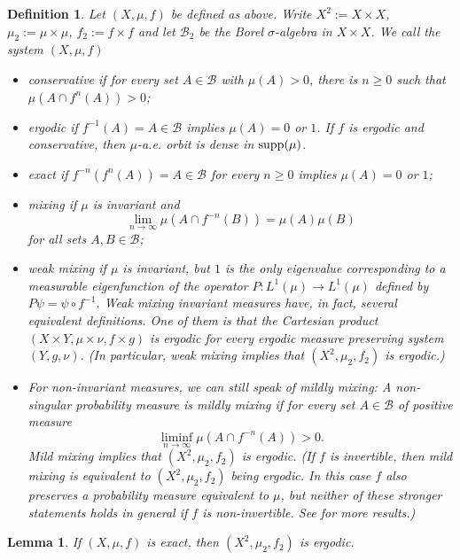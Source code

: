 \documentclass[12pt, psamsfonts, reqno]{amsart}
\newtheorem{definition}[theorem]{Definition}
\newtheorem{lemma}[theorem]{Lemma}
\begin{document}
\begin{definition}
 Let $(X,\mu,f)$ be defined as above. Write $X^2 := X
 \times X$, $\mu_2 := \mu \times \mu$, $f_2 := f \times f$ and let
 ${{\mathcal B}}_2$ be the Borel $\sigma$-algebra in $X\times X$. We
 call the system $(X, \mu, f)$
 \begin{itemize}
  \item \emph{conservative} if for every set $A \in {{\mathcal B}}$ with $\mu(A) > 0$,
    there is $n \geq 0$ such that $\mu(A \cap f^n(A)) > 0$;
  \item \emph{ergodic} if $f^{-1}(A) = A \in {{\mathcal B}}$ implies $\mu(A) = 0$ or
    $1$. If $f$ is ergodic and conservative, then $\mu$-a.e. orbit is dense in ${\mathop{\rm supp}\nolimits}(\mu)$.
  \item \emph{exact} if $f^{-n}(f^n(A)) = A \in {{\mathcal B}}$ for every
    $n \geq 0$ implies $\mu(A) = 0$ or $1$;
   \item \emph{mixing} if $\mu$ is invariant and
    $$
     \lim_{n\to \infty} \mu(A \cap f^{-n}(B)) =\mu(A)\mu(B)
    $$
    for all sets $A,B \in {{\mathcal B}}$;
  \item \emph{weak mixing}\label{def:weak_mixing} if $\mu$ is invariant,
    but $1$ is the only
    eigenvalue corresponding to a measurable eigenfunction of the
    operator $P:L^1(\mu) \to L^1(\mu)$ defined by $P\psi = \psi \circ
    f^{-1}$. Weak mixing invariant measures have, in fact, several
    equivalent definitions. One of them is that the Cartesian product
    $(X \times Y, \mu \times \nu,f \times g)$ is ergodic for every
    ergodic measure preserving system $(Y,g,\nu)$. (In particular,
    weak mixing implies that $(X^2,\mu_2,f_2)$ is ergodic.)
  \item For non-invariant measures, we can still speak of mildly mixing:
    A non-singular probability measure is \emph{mildly mixing} if for
    every set $A \in {{\mathcal B}}$ of positive measure
    $$
     \liminf_{n\to \infty} \mu(A \cap f^{-n}(A)) > 0.
    $$
    Mild mixing implies that $(X^2,\mu_2,f_2)$ is ergodic. (If $f$ is
    invertible, then mild mixing is equivalent to
    $(X^2,\mu_2,f_2)$ being ergodic. In this case $f$ also preserves a
    probability
    measure equivalent to $\mu$, but neither of these stronger
    statements holds in general if $f$ is non-invertible. See
   \cite{HawSil} for more results.)
 \end{itemize}
\end{definition}

\begin{lemma} \label{exact-ergodic}
 If $(X,\mu,f)$ is exact, then $(X^2,\mu_2,f_2)$ is ergodic.
\end{lemma}
\end{document}
